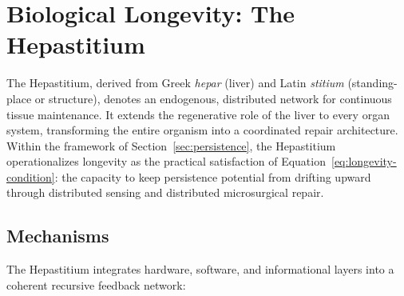 \documentclass[12pt]{article}
\begin{document}
\section{Biological Longevity: The Hepastitium}
\label{sec:hepastitium}

The Hepastitium, derived from Greek \emph{hepar} (liver) and Latin \emph{stitium} (standing-place or structure), denotes an endogenous, distributed network for continuous tissue maintenance. It extends the regenerative role of the liver to every organ system, transforming the entire organism into a coordinated repair architecture. Within the framework of Section~\ref{sec:persistence}, the Hepastitium operationalizes longevity as the practical satisfaction of Equation~\eqref{eq:longevity-condition}: the capacity to keep persistence potential from drifting upward through distributed sensing and distributed microsurgical repair.

\subsection{Mechanisms}

The Hepastitium integrates hardware, software, and informational layers into a coherent recursive feedback network:
\end{document}
